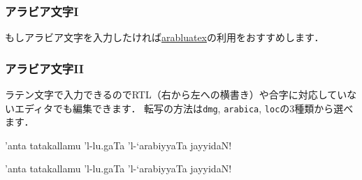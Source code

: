 \documentclass[%
  hyperref={%
    colorlinks,
    linkcolor=sDarkBlue,
    urlcolor=sDarkBlue,
    citecolor=sDarkBlue
  },
  aspectratio=169
]{beamer}
\begin{document}
    \begin{frame}[fragile]
    \frametitle{アラビア文字I}
        もしアラビア文字を入力したければ\href{https://ctan.org/pkg/arabluatex?lang=en}{arabluatex}の利用をおすすめします．
    \begin{leftbar}
\begin{LaTeXCode}
\usepackage{arabluatex}
\newfontfamily{}
\newfontfamily{}
\SetTranslitFont{\translitfont}
\SetTranslitStyle{\itshape} %
{} %
\end{LaTeXCode}
    \end{leftbar}
    \end{frame}

    \begin{frame}[fragile]
        \frametitle{アラビア文字II}
        ラテン文字で入力できるのでRTL（右から左への横書き）や合字に対応していないエディタでも編集できます．
        転写の方法は\texttt{dmg}, \texttt{arabica}, \texttt{loc}の3種類から選べます．

        \begin{leftbar}
\begin{LaTeXCode}
\begin{arab}[fullvoc]
    'anta tatakallamu 'l-lu.gaTa
    'l-`arabiyyaTa jayyidaN!
\end{arab}
\end{LaTeXCode}
        \end{leftbar}

        \begin{arab}[fullvoc]
            'anta tatakallamu 'l-lu.gaTa 'l-`arabiyyaTa jayyidaN!
        \end{arab}

        \bigskip

    \end{frame}
\end{document}
